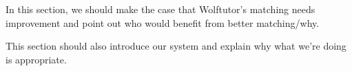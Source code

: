 In this section, we should make the case that Wolftutor's matching needs
improvement and point out who would benefit from better matching/why.

This section should also introduce our system and explain why what we're doing
is appropriate.
